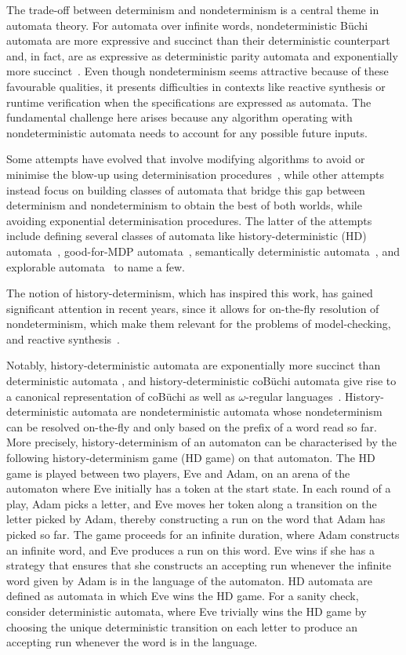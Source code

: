 The trade-off between determinism and nondeterminism is a central theme in automata theory. For automata over infinite words, nondeterministic B\"uchi automata are more expressive and succinct than their deterministic counterpart and, in fact, are as expressive as deterministic parity automata and exponentially more succinct~\cite{McN66,Saf88}. Even though nondeterminism seems attractive because of these favourable qualities, it presents difficulties in contexts like reactive synthesis or runtime verification when the specifications are expressed as automata. The
fundamental challenge here arises because any algorithm operating with nondeterministic automata needs to account for any possible future inputs.

Some attempts have evolved that involve modifying algorithms to avoid or minimise the blow-up using determinisation procedures~\cite{KPV06,KV05,EKS16}, while other attempts instead focus on building classes of automata that bridge this gap between determinism and nondeterminism to obtain the best of both worlds, while avoiding exponential determinisation procedures. 
The latter of the attempts include defining several classes of automata like history-deterministic (HD) automata~\cite{HP06}, good-for-MDP automata~\cite{HPSS0W20}, semantically deterministic automata~\cite{KS15,AK20}, and explorable automata~\cite{HK23} to name a few. 

The notion of history-determinism, which has inspired this work, has gained significant attention in recent years, since it allows for on-the-fly resolution of nondeterminism, which make them relevant for the problems of model-checking, and reactive synthesis~\cite[Page 22]{BL23}. 

Notably, history-deterministic automata are exponentially more succinct than deterministic automata \cite[Theorem 1]{KS15}, and history-deterministic coB\"uchi automata give rise to a canonical representation of coB\"uchi as well as $\omega$-regular languages~\cite{AK22,ES22}. History-deterministic automata are nondeterministic automata whose nondeterminism can be resolved on-the-fly and only based on the prefix of a word read so far. 
More precisely, history-determinism of an automaton can be characterised by the following history-determinism game (HD game) on that automaton. The HD game is played between two players, Eve and Adam, on an arena of the automaton where Eve initially has a token at the start state. In each round of a play, Adam picks a letter, and Eve moves her token along a transition on the letter picked by Adam, thereby constructing a run on the word that Adam has picked so far. The game proceeds for an infinite duration, where Adam constructs an infinite word, and Eve produces a run on this word. Eve wins if she has a strategy that ensures that she constructs an accepting run whenever the infinite word given by Adam is in the language of the automaton. HD automata are defined as  automata in which Eve wins the HD game. For a sanity check, consider deterministic automata, where Eve trivially wins the HD game by choosing the unique deterministic transition on each letter to produce an accepting run whenever the word is in the language. 

